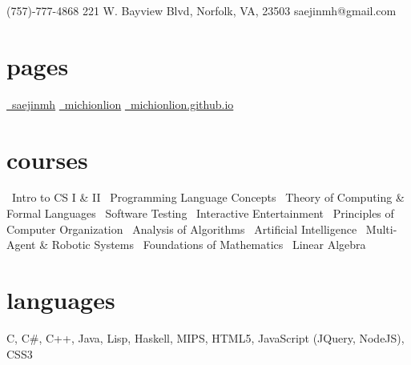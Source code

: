 \documentclass[]{friggeri-cv}
\begin{document}
       {\faMobilePhone\hspace{1mm}(757)-777-4868 \hspace{1cm} 221 W. Bayview Blvd, Norfolk, VA, 23503 \hspace{1.5cm} \faEnvelope\hspace{1.5mm}saejinmh@gmail.com}

\begin{aside}
  \section{pages}\vspace{0.05cm}
    \href{https://www.linkedin.com/in/saejinmh}{\faLinkedin\ saejinmh}\vspace{0.03cm}
    \href{https://github.com/Michionlion}{\faGithub\ michionlion}\vspace{0.03cm}
    \href{https://michionlion.github.io}{\faGlobe\ michionlion.github.io}\vspace{0.03cm}
  \section{courses}\vspace{0.05cm}
	\bullet\ Intro to CS I \& II\vspace{0.1cm}
	\bullet\ Programming Language Concepts\vspace{0.1cm}
	\bullet\ Theory of Computing \& Formal Languages\vspace{0.1cm}	
	\bullet\ Software Testing\vspace{0.1cm}
	\bullet\ Interactive Entertainment\vspace{0.1cm}
	\bullet\ Principles of Computer Organization\vspace{0.1cm}
    \bullet\ Analysis of Algorithms\vspace{0.1cm}
    \bullet\ Artificial Intelligence\vspace{0.1cm}
    \bullet\ Multi-Agent \& Robotic Systems\vspace{0.1cm}
    \bullet\ Foundations of Mathematics\vspace{0.1cm}
    \bullet\ Linear Algebra\vspace{0.1cm}
  \section{languages}\vspace{0.05cm}
    C, C\#, C++, Java, Lisp, Haskell, MIPS, HTML5, JavaScript (JQuery, NodeJS), CSS3\vspace{0.1cm}

\end{aside}
\end{document}
